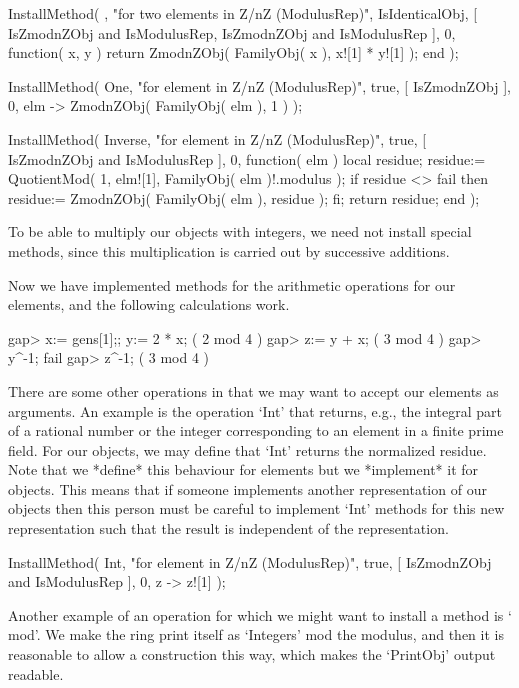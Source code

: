 \begintt
    InstallMethod( \*,
        "for two elements in Z/nZ (ModulusRep)",
        IsIdenticalObj,
        [ IsZmodnZObj and IsModulusRep, IsZmodnZObj and IsModulusRep ],
        0,
        function( x, y )
        return ZmodnZObj( FamilyObj( x ), x![1] * y![1] );
        end );

    InstallMethod( One,
        "for element in Z/nZ (ModulusRep)",
        true,
        [ IsZmodnZObj ], 0,
        elm -> ZmodnZObj( FamilyObj( elm ), 1 ) );

    InstallMethod( Inverse,
        "for element in Z/nZ (ModulusRep)",
        true,
        [ IsZmodnZObj and IsModulusRep ], 0,
        function( elm )
        local residue;
        residue:= QuotientMod( 1, elm![1], FamilyObj( elm )!.modulus );
        if residue <> fail then
          residue:= ZmodnZObj( FamilyObj( elm ), residue );
        fi;
        return residue;
        end );
\endtt

To be able to multiply our objects with integers,
we need not install special methods,
since this multiplication is carried out by successive additions.

Now we have implemented methods for the arithmetic operations for our
elements, and the following calculations work.

\begintt
    gap> x:= gens[1];; y:= 2 * x;
    ( 2 mod 4 )
    gap> z:= y + x;
    ( 3 mod 4 )
    gap> y^-1;
    fail
    gap> z^-1;
    ( 3 mod 4 )
\endtt

There are some other operations in {\GAP} that we may want to accept
our elements as arguments.
An example is the operation `Int' that returns, e.g.,
the integral part of a rational number or the integer corresponding to
an element in a finite prime field.
For our objects, we may define that `Int' returns the normalized residue.
Note that we *define* this behaviour for elements
but we *implement* it for objects.
This means that if someone implements another representation of our
objects then this person must be careful to implement `Int' methods for
this new representation such that the result is independent of the
representation.

\begintt
    InstallMethod( Int,
        "for element in Z/nZ (ModulusRep)",
        true,
        [ IsZmodnZObj and IsModulusRep ], 0,
        z -> z![1] );
\endtt

Another example of an operation for which we might want to install
a method is `\\mod'.
We make the ring print itself as `Integers' mod the modulus,
and then it is reasonable to allow a construction this way,
which makes the `PrintObj' output {\GAP} readable.

